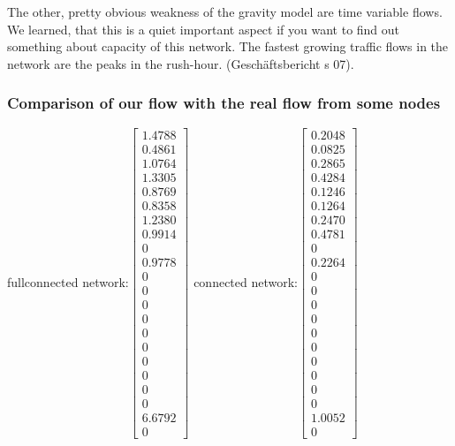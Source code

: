 \documentclass[11pt]{article}
\begin{document}
The other, pretty obvious weakness of the gravity model are time variable flows. We learned, that this is a quiet important aspect if you want to find out something about capacity of this network. The fastest growing traffic flows in the network are the peaks in the rush-hour. (Geschäftsbericht s 07).

\subsubsection{Comparison of our flow with the real flow from some nodes}
fullconnected network:$\begin{bmatrix}
    1.4788\\
    0.4861\\
    1.0764\\
    1.3305\\
    0.8769\\
    0.8358\\
    1.2380\\
    0.9914\\
         0\\
    0.9778\\
         0\\
         0\\
         0\\
         0\\
         0\\
         0\\
         0\\
         0\\
         0\\
         0\\
    6.6792\\
         0
\end{bmatrix}$
connected network:$\begin{bmatrix}
    0.2048\\
    0.0825\\
    0.2865\\
    0.4284\\
    0.1246\\
    0.1264\\
    0.2470\\
    0.4781\\
         0\\
    0.2264\\
         0\\
         0\\
         0\\
         0\\
         0\\
         0\\
         0\\
         0\\
         0\\
         0\\
    1.0052\\
         0

\end{bmatrix}$
\end{document}
